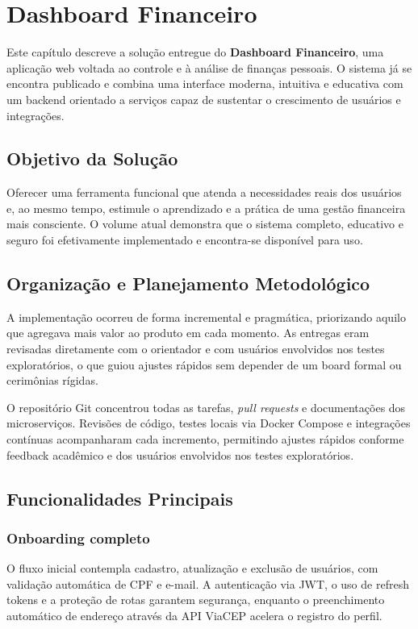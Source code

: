 \chapter{\label{chap:chap3}Dashboard Financeiro}

Este capítulo descreve a solução entregue do \textbf{Dashboard Financeiro}, uma aplicação web voltada ao controle e à análise de finanças pessoais. O sistema já se encontra publicado e combina uma interface moderna, intuitiva e educativa com um backend orientado a serviços capaz de sustentar o crescimento de usuários e integrações.

\section{Objetivo da Solução}

Oferecer uma ferramenta funcional que atenda a necessidades reais dos usuários e, ao mesmo tempo, estimule o aprendizado e a prática de uma gestão financeira mais consciente. O volume atual demonstra que o sistema completo, educativo e seguro foi efetivamente implementado e encontra-se disponível para uso.

\section{Organização e Planejamento Metodológico}

A implementação ocorreu de forma incremental e pragmática, priorizando aquilo que agregava mais valor ao produto em cada momento. As entregas eram revisadas diretamente com o orientador e com usuários envolvidos nos testes exploratórios, o que guiou ajustes rápidos sem depender de um board formal ou cerimônias rígidas.

O repositório Git concentrou todas as tarefas, \textit{pull requests} e documentações dos microserviços. Revisões de código, testes locais via Docker Compose e integrações contínuas acompanharam cada incremento, permitindo ajustes rápidos conforme feedback acadêmico e dos usuários envolvidos nos testes exploratórios.

\section{Funcionalidades Principais}

\subsection{Onboarding completo}
O fluxo inicial contempla cadastro, atualização e exclusão de usuários, com validação automática de CPF e e\hyp mail. A autenticação via JWT, o uso de refresh tokens e a proteção de rotas garantem segurança, enquanto o preenchimento automático de endereço através da API ViaCEP acelera o registro do perfil.

